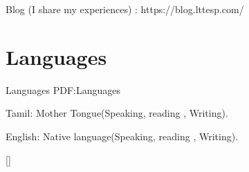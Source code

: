 \documentclass[letterpaper,MMMyyyy,nonstop]{simpleresumecv}
\begin{document}
\begin{body}
\GapNoBreak
\BulletItem
Blog (I share my experiences) : https://blog.lttesp.com/


\section
{Languages}
{Languages}
{PDF:Languages}

\BulletItem
Tamil: Mother Tongue(Speaking, reading , Writing).

\GapNoBreak
\BulletItem
English: Native language(Speaking, reading , Writing).



\end{body}


\UseNoteFont%
\null\hfill%
[\textit{\CVNote}]%
\hspace{2.0mm}\null
\end{document}
